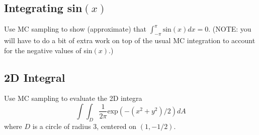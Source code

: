 \documentclass{article}
\begin{document}
\subsection{Integrating sin$(x)$}

Use MC sampling to show (approximate) that $\int_{-\pi}^{\pi} \textrm{sin}(x) dx = 0$. (NOTE: you will have to do a bit of extra work on top of the usual MC integration to account for the negative values of sin$(x)$.)

\subsection{2D Integral}

Use MC sampling to evaluate the 2D integra
\begin{equation}
	\int \int_{D} \frac{1}{2 \pi} \textrm{exp}(-(x^2+y^2)/2) dA
\end{equation}
where $D$ is a circle of radius 3, centered on $(1,-1/2)$.
\end{document}
